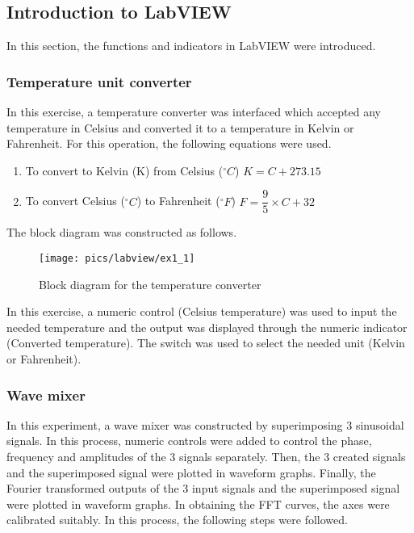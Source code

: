 \subsection{Introduction to LabVIEW}

In this section, the functions and indicators in LabVIEW were introduced.

\subsubsection{Temperature unit converter}

In this exercise, a temperature converter was interfaced which accepted any temperature in Celsius and converted it to a temperature in Kelvin or Fahrenheit. For this operation, the following equations were used. 
\begin{enumerate}
	\item To convert to Kelvin (K) from Celsius ($^{\circ}C$)
			\newline $ K=C+273.15 $
 	\item To convert Celsius ($^{\circ}C$) to Fahrenheit ($^{\circ}F$)
			\newline $ F=\dfrac{9}{5} \times C+ 32$
\end{enumerate}

\noindent
The block diagram was constructed as follows.

\begin{figure}[!h]
	\centering
	\texttt{[image: pics/labview/ex1\_1]}
	\caption{Block diagram for the temperature converter}
	\label{fig:ex1
	}
\end{figure}

\noindent
In this exercise, a numeric control (Celsius temperature) was used to input the needed temperature and the output was displayed through the numeric indicator (Converted temperature). The switch was used to select the needed unit (Kelvin or Fahrenheit).

\subsubsection{Wave mixer}

In this experiment, a wave  mixer was constructed by superimposing  3 sinusoidal signals. In this process, numeric controls were added to control the phase, frequency and amplitudes of the 3 signals separately. Then, the 3  created signals and the superimposed signal were plotted in waveform graphs. Finally, the Fourier transformed outputs of the 3 input signals and the superimposed signal were plotted in waveform graphs. In obtaining the FFT curves, the axes were calibrated suitably. In this process, the following steps were followed.

